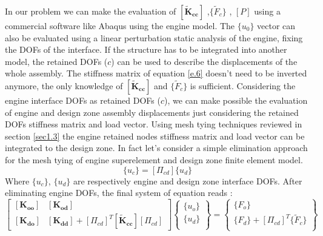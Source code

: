 In our problem we can make the evaluation of $ \left[ \mathbf{\tilde{K}_{cc}}\right]$ ,$\lbrace \tilde{F}_c \rbrace$ , $\left[ P\right]$ using a commercial software like Abaqus using the engine model. 
The $\lbrace u_0 \rbrace$ vector can also be evaluated using a linear perturbation static analysis of the engine, fixing the DOFs of the interface. If the structure has to be integrated into another model, the retained DOFs ($c$) can be used to describe the displacements of the whole assembly. The stiffness matrix of equation \ref{e.6} doesn't need to be inverted anymore, the only knowledge of $\left[\mathbf{\tilde{K}_{cc}}\right]$ and $\lbrace \tilde{F}_c \rbrace$ is sufficient.
Considering the engine interface DOFs as retained DOFs ($c$), we can make possible the evaluation of engine and design zone assembly displacements just considering the retained DOFs stiffness matrix and load vector. Using mesh tying techniques reviewed in section \ref{sec1.3} the engine retained nodes stiffness matrix and load vector can be integrated to the design zone.
In fact let's consider a simple elimination approach for the mesh tying of engine superelement and design zone finite element model.
  \begin{equation}
    \lbrace u_c \rbrace = \left[ \Pi_{cd} \right] \lbrace u_{d}\rbrace
    \end{equation}
Where $\lbrace u_c \rbrace$, $\lbrace u_{d}\rbrace $ are respectively engine and design zone interface DOFs.
After eliminating engine DOFs, the final system of equation reads :
    \begin{equation}
    \label{eq.1.119}
    \left[ \begin{array}{cc}
    \left[ \mathbf{K_{oo}} \right] & \left[ \mathbf{K_{od}} \right]\\
    \left[ \mathbf{K_{do}} \right] & \left[ \mathbf{K_{dd}} \right]+\left[ \Pi_{cd} \right]^T\left[ \mathbf{\tilde{K}_{cc}} \right]\left[ \Pi_{cd} \right]
    \end{array} \right] \left\lbrace \begin{array}{c}
    \lbrace u_o \rbrace\\
    \lbrace u_d \rbrace\\
    \end{array}\right\rbrace =  \left\lbrace \begin{array}{c}
    \lbrace F_o \rbrace\\
    \lbrace F_d\rbrace+\left[ \Pi_{cd} \right]^T\lbrace \tilde{F}_c\rbrace\\
    \end{array}\right\rbrace
    \end{equation} 
